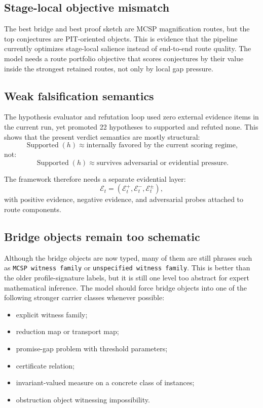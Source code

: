 \documentclass[11pt]{article}
\begin{document}
\subsection{Stage-local objective mismatch}

The best bridge and best proof sketch are MCSP magnification routes, but the top conjectures are PIT-oriented objects. This is evidence that the pipeline currently optimizes stage-local salience instead of end-to-end route quality. The model needs a route portfolio objective that scores conjectures by their value inside the strongest retained routes, not only by local gap pressure.

\subsection{Weak falsification semantics}

The hypothesis evaluator and refutation loop used zero external evidence items in the current run, yet promoted 22 hypotheses to supported and refuted none. This shows that the present verdict semantics are mostly structural:
\[
\operatorname{Supported}(h) \approx \text{internally favored by the current scoring regime},
\]
not:
\[
\operatorname{Supported}(h) \approx \text{survives adversarial or evidential pressure}.
\]

The framework therefore needs a separate evidential layer:
\[
\mathcal{E}_t = (\mathcal{E}^{+}_t, \mathcal{E}^{-}_t, \mathcal{E}^{\pm}_t),
\]
with positive evidence, negative evidence, and adversarial probes attached to route components.

\subsection{Bridge objects remain too schematic}

Although the bridge objects are now typed, many of them are still phrases such as \texttt{MCSP witness family} or \texttt{unspecified witness family}. This is better than the older profile-signature labels, but it is still one level too abstract for expert mathematical inference. The model should force bridge objects into one of the following stronger carrier classes whenever possible:

\begin{itemize}[leftmargin=*,itemsep=0.2em]
\item explicit witness family;
\item reduction map or transport map;
\item promise-gap problem with threshold parameters;
\item certificate relation;
\item invariant-valued measure on a concrete class of instances;
\item obstruction object witnessing impossibility.
\end{itemize}
\end{document}
